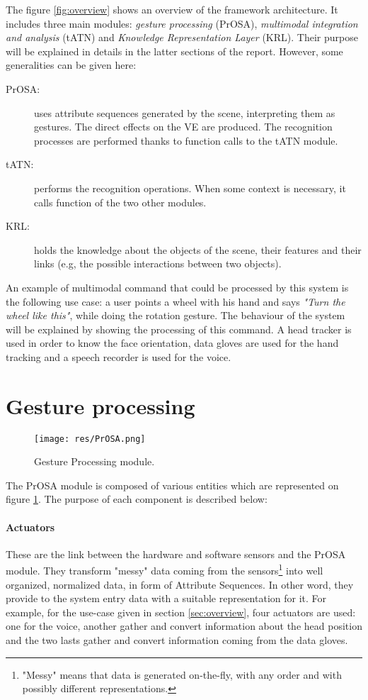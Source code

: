 \documentclass[a4paper]{article}
\begin{document}
The figure \ref{fig:overview} shows an overview of the framework architecture. It includes three main modules: \textit{gesture processing} (PrOSA), \textit{multimodal integration and analysis} (tATN) and \textit{Knowledge Representation Layer} (KRL). Their purpose will be explained in details in the latter sections of the report. However, some generalities can be given here:
\begin{description}
	\item[PrOSA:] uses attribute sequences generated by the scene, interpreting them as gestures. The direct effects on the VE are produced. The recognition processes are performed thanks to function calls to the tATN module.
	\item[tATN:] performs the recognition operations. When some context is necessary, it calls function of the two other modules.
	\item[KRL:] holds the knowledge about the objects of the scene, their features and their links (e.g, the possible interactions between two objects).
\end{description}

An example of multimodal command that could be processed by this system is the following use case: a user points a wheel with his hand and says \textit{"Turn the wheel like this"}, while doing the rotation gesture. The behaviour of the system will be explained by showing the processing of this command. A head tracker is used in order to know the face orientation, data gloves are used for the hand tracking and a speech recorder is used for the voice.

\section{Gesture processing}

\begin{figure}
\centering
\texttt{[image: res/PrOSA.png]}
\caption{\label{fig:PrOSA}Gesture Processing module.}
\end{figure}

The PrOSA module is composed of various entities which are represented on figure \ref{fig:PrOSA}. The purpose of each component is described below:

\paragraph{Actuators} These are the link between the hardware and software sensors and the PrOSA module. They transform "messy" data coming from the sensors\footnote{"Messy" means that data is generated on-the-fly, with any order and with possibly different representations.} into well organized, normalized data, in form of Attribute Sequences. In other word, they provide to the system entry data with a suitable representation for it. For example, for the use-case given in section \ref{sec:overview}, four actuators are used: one for the voice, another gather and convert information about the head position and the two lasts gather and convert information coming from the data gloves.
\end{document}
